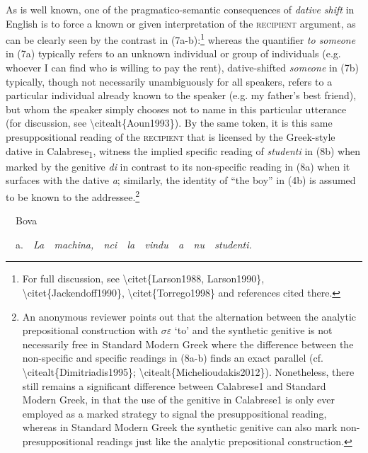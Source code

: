 \documentclass[output=paper,modfonts,nonflat]{langsci/langscibook}
\begin{document}
\begin{styleStandard}
As is well known, one of the pragmatico-semantic consequences of \textit{dative shift }in English is to force a known or given interpretation of the \textsc{recipient} argument, as can be clearly seen by the contrast in (7a-b):\footnote{ For full discussion, see {\textbackslash}citet\{Larson1988, Larson1990\}, {\textbackslash}citet\{Jackendoff1990\}, {\textbackslash}citet\{Torrego1998\} and references cited there.} whereas the quantifier \textit{to someone }in (7a) typically refers to an unknown individual or group of individuals (e.g. whoever I can find who is willing to pay the rent), dative-shifted \textit{someone} in (7b) typically, though not necessarily unambiguously for all speakers, refers to a particular individual already known to the speaker (e.g. my father’s best friend), but whom the speaker simply chooses not to name in this particular utterance (for discussion, see {\textbackslash}citealt\{Aoun1993\}). By the same token, it is this same presuppositional reading of the \textsc{recipient} that is licensed by the Greek-style dative\textit{ }in Calabrese\textsubscript{1}, witness the implied specific reading of \textit{studenti} in (8b) when marked by the genitive \textit{di} in contrast to its non-specific reading in (8a) when it surfaces with the dative \textit{a}; similarly, the identity of “the boy” in (4b) is assumed to be known to the addressee.\footnote{ An anonymous reviewer points out that the alternation between the analytic prepositional construction with \textrm{${\sigma}{\varepsilon}$} ‘to’ and the synthetic genitive is not necessarily free in Standard Modern Greek where the difference between the non-specific and specific readings in (8a-b) finds an exact parallel (cf. {\textbackslash}citealt\{Dimitriadis1995\}; {\textbackslash}citealt\{Michelioudakis2012\}). Nonetheless, there still remains a significant difference between Calabrese1 and Standard Modern Greek, in that the use of the genitive in Calabrese1 is only ever employed as a marked strategy to signal the presuppositional reading, whereas in Standard Modern Greek the synthetic genitive can also mark non-presuppositional readings just like the analytic prepositional construction.}
\end{styleStandard}

\begin{listWWNumviiileveli}
\item 
\begin{styleListParagraph}
\ \ Bova
\end{styleListParagraph}
\end{listWWNumviiileveli}
\begin{styleStandard}
\ \ a.\ \ \textit{La\ \ machina,\ \ nci\ \ la\ \ vindu\ \ a\ \ nu\ \ studenti.}
\end{styleStandard}
\end{document}
